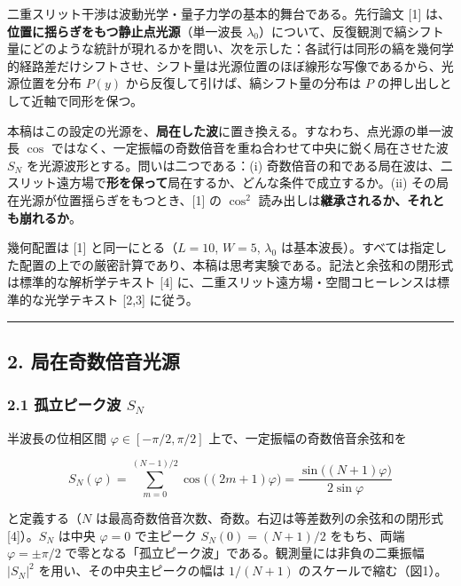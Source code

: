 \documentclass[
]{ltjsarticle}
\begin{document}
二重スリット干渉は波動光学・量子力学の基本的舞台である。先行論文 {[}1{]}
は、\textbf{位置に揺らぎをもつ静止点光源}（単一波長
\(\lambda_0\)）について、反復観測で縞シフト量にどのような統計が現れるかを問い、次を示した：各試行は同形の縞を幾何学的経路差だけシフトさせ、シフト量は光源位置のほぼ線形な写像であるから、光源位置を分布
\(P(y)\) から反復して引けば、縞シフト量の分布は \(P\)
の押し出しとして近軸で同形を保つ。

本稿はこの設定の光源を、\textbf{局在した波}に置き換える。すなわち、点光源の単一波長
\(\cos\)
ではなく、一定振幅の奇数倍音を重ね合わせて中央に鋭く局在させた波 \(S_N\)
を光源波形とする。問いは二つである：(i)
奇数倍音の和である局在波は、二スリット遠方場で\textbf{形を保って}局在するか、どんな条件で成立するか。(ii)
その局在光源が位置揺らぎをもつとき、{[}1{]} の \(\cos^2\)
読み出しは\textbf{継承されるか、それとも崩れるか}。

幾何配置は {[}1{]} と同一にとる（\(L=10\), \(W=5\), \(\lambda_0\)
は基本波長）。すべては指定した配置の上での厳密計算であり、本稿は思考実験である。記法と余弦和の閉形式は標準的な解析学テキスト
{[}4{]} に、二重スリット遠方場・空間コヒーレンスは標準的な光学テキスト
{[}2,3{]} に従う。

\begin{center}\rule{0.5\linewidth}{0.5pt}\end{center}

\subsection{2.
局在奇数倍音光源}\label{ux5c40ux5728ux5947ux6570ux500dux97f3ux5149ux6e90}

\subsubsection{\texorpdfstring{2.1 孤立ピーク波
\(S_N\)}{2.1 孤立ピーク波 S\_N}}\label{ux5b64ux7acbux30d4ux30fcux30afux6ce2-s_n}

半波長の位相区間 \(\varphi\in[-\pi/2,\pi/2]\)
上で、一定振幅の奇数倍音余弦和を

\[
S_N(\varphi)=\sum_{m=0}^{(N-1)/2}\cos\!\big((2m+1)\varphi\big)
=\frac{\sin\!\big((N+1)\varphi\big)}{2\sin\varphi}
\tag{2.1}
\]

と定義する（\(N\)
は最高奇数倍音次数、奇数。右辺は等差数列の余弦和の閉形式
{[}4{]}）。\(S_N\) は中央 \(\varphi=0\) で主ピーク \(S_N(0)=(N+1)/2\)
をもち、両端 \(\varphi=\pm\pi/2\)
で零となる「孤立ピーク波」である。観測量には非負の二乗振幅 \(|S_N|^2\)
を用い、その中央主ピークの幅は \(1/(N+1)\) のスケールで縮む（図1）。
\end{document}
